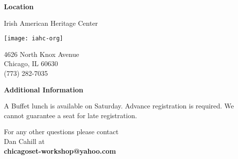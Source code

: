 \documentclass[12pt,
letterpaper]{leaflet}
\begin{document}
\pagebreak

\begin{flushleft}
{\Large \textbf{Location}}

\vspace*{1.5em}
{\large {Irish American Heritage Center}}
\end{flushleft}

\vspace*{0.45em}
\begin{center}
\texttt{[image: iahc-org]}
\end{center}

4626 North Knox Avenue\\
Chicago, IL 60630\\
(773) 282-7035

\begin{flushleft}
{\large \textbf{Additional Information}}

\vspace*{1em}
A Buffet lunch is available on Saturday.  Advance registration is required.  We cannot guarantee a seat for late registration.

For any other questions please contact  \\Dan Cahill at\\ \textbf{chicagoset-workshop@yahoo.com}
\end{flushleft}
\end{document}
